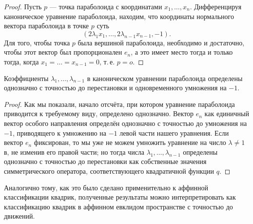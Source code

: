 \begin{enumerate}
        \begin{proof}
            Пусть $p$ --- точка параболоида с координатами $x_1, \ldots, x_n$. Дифференцируя каноническое уравнение параболоида, находим, что координаты нормального вектора параболоида в точке $p$ суть
            \[
                (2\lambda_1x_1, \ldots, 2\lambda_{n - 1}x_{n - 1}, -1).
            \]
            Для того, чтобы точка $p$ была вершиной параболоида, необходимо и достаточно, чтобы этот вектор был пропорционален $e_n$, а это имеет место тогда и только тогда, когда $x_1 = \ldots = x_{n - 1} = 0$, т.\,е. $p = o$.
        \end{proof}

        \begin{corollary}
            Коэффициенты $\lambda_1, \ldots, \lambda_{n - 1}$ в каноническом уравнении параболоида определены однозначно с точностью до перестановки и одновременного умножения на $-1$.
        \end{corollary}

        \begin{proof}
            Как мы показали, начало отсчёта, при котором уравнение параболоида приводится к требуемому виду, определено однозначно. Вектор $e_n$ как единичный вектор особого направления определён однозначно с точностью до умножения на $-1$, приводящего к умножению на $-1$ левой части нашего уравнения. Если вектор $e_n$ фиксирован, то мы уже не можем умножить уравнение на число $\lambda \ne 1$в, не изменив его правой части; но тогда числа $\lambda_1, \ldots, \lambda_{n - 1}$ определены однозначно с точностью до перестановки как собственные значения симметрического оператора, соответствующего квадратичной функции $q$.
        \end{proof}
\end{enumerate}

Аналогично тому, как это было сделано применительно к аффинной классификации квадрик, полученные результаты можно интерпретировать как классификацию квадрик в аффинном евклидом пространстве с точностью до движений.

